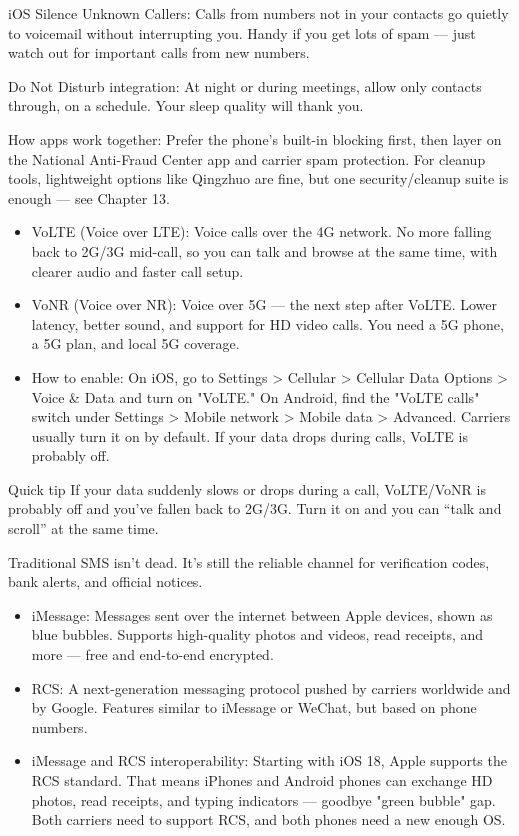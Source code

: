 iOS Silence Unknown Callers: Calls from numbers not in your contacts go quietly to voicemail without interrupting you. Handy if you get lots of spam — just watch out for important calls from new numbers.

Do Not Disturb integration: At night or during meetings, allow only contacts through, on a schedule. Your sleep quality will thank you.

How apps work together: Prefer the phone's built-in blocking first, then layer on the National Anti-Fraud Center app and carrier spam protection. For cleanup tools, lightweight options like Qingzhuo are fine, but one security/cleanup suite is enough — see Chapter 13.


\begin{itemize}
  \item VoLTE (Voice over LTE): Voice calls over the 4G network. No more falling back to 2G/3G mid-call, so you can talk and browse at the same time, with clearer audio and faster call setup.
  \item VoNR (Voice over NR): Voice over 5G — the next step after VoLTE. Lower latency, better sound, and support for HD video calls. You need a 5G phone, a 5G plan, and local 5G coverage.
  \item How to enable: On iOS, go to Settings > Cellular > Cellular Data Options > Voice \& Data and turn on "VoLTE." On Android, find the "VoLTE calls" switch under Settings > Mobile network > Mobile data > Advanced. Carriers usually turn it on by default. If your data drops during calls, VoLTE is probably off.
\end{itemize}

\begin{tcbinfo}{Quick tip}
If your data suddenly slows or drops during a call, VoLTE/VoNR is probably off and you've fallen back to 2G/3G. Turn it on and you can “talk and scroll” at the same time.

\end{tcbinfo}


Traditional SMS isn't dead. It's still the reliable channel for verification codes, bank alerts, and official notices.

\begin{itemize}
  \item iMessage: Messages sent over the internet between Apple devices, shown as blue bubbles. Supports high-quality photos and videos, read receipts, and more — free and end-to-end encrypted.
  \item RCS: A next-generation messaging protocol pushed by carriers worldwide and by Google. Features similar to iMessage or WeChat, but based on phone numbers.
  \item iMessage and RCS interoperability: Starting with iOS 18, Apple supports the RCS standard. That means iPhones and Android phones can exchange HD photos, read receipts, and typing indicators — goodbye "green bubble" gap. Both carriers need to support RCS, and both phones need a new enough OS.
\end{itemize}


